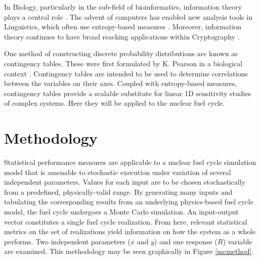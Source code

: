 \documentclass[preprint,12pt]{elsarticle}
\begin{document}
In Biology, particularly in the sub-field of bioinformatics, information theory plays a 
central role \cite{Rashevsky1955,Yockey2011}.  The advent of computers has enabled new 
analysis tools in Linguistics, which often use entropy-based measures \cite{Manning1999}. 
Moreover, information theory continues to have broad reaching applications within Cryptography
\cite{Ahlswede1993}.

One method of constructing discrete probability distributions are known as contingency tables.  
These were first formulated by K. Pearson in a biological context 
\cite{Pearson1904}.  Contingency tables are intended to be used to determine correlations 
between the variables on their axes.  Coupled with entropy-based measures, contingency 
tables provide a scalable substitute for linear 1D sensitivity studies of complex
systems.  Here they will be applied to the nuclear fuel cycle.


\section{Methodology}
\label{sec:methodology}

Statistical performance measures are applicable to a nuclear fuel cycle simulation model that
is amenable to stochastic execution under variation of several independent parameters.  Values
for each input are to be chosen stochastically from a predefined, physically-valid range.
By generating many inputs and tabulating the corresponding results from an underlying physics-based
fuel cycle model, the fuel cycle undergoes a Monte Carlo simulation.  An input-output vector
constitutes a single fuel cycle realization.  From here, relevant statistical metrics on the set of
realizations yield information on how the system as a whole performs.  
Two independent parameters ($x$ and $y$) and one response ($R$) variable are examined.
This methodology may be seen graphically in Figure \ref{mcmethod}.
\end{document}
